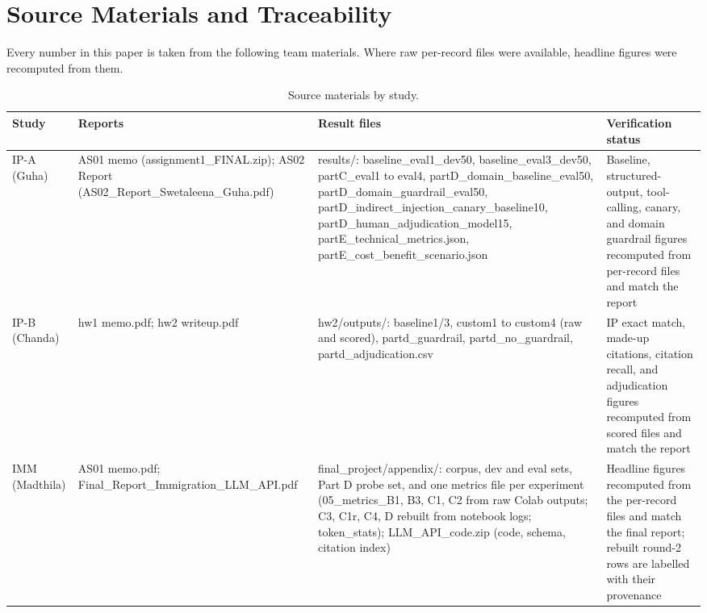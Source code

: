\documentclass[10pt,letterpaper]{article}
\begin{document}
\appendix
\sloppy
\section{Source Materials and Traceability}\label{app:sources}
Every number in this paper is taken from the following team materials. Where raw per-record files were available, headline figures were recomputed from them.

\begin{table}[H]
\centering\footnotesize
\caption{Source materials by study.}
\begin{tabularx}{\textwidth}{@{}p{1.8cm}p{3.2cm}LL@{}}
\toprule
\textbf{Study} & \textbf{Reports} & \textbf{Result files} & \textbf{Verification status}\\
\midrule
IP-A (Guha) & AS01 memo (assignment1\_\allowbreak{}FINAL.zip); AS02 Report (AS02\_\allowbreak{}Report\_\allowbreak{}Swetaleena\_\allowbreak{}Guha.pdf) & results/: baseline\_\allowbreak{}eval1\_\allowbreak{}dev50, baseline\_\allowbreak{}eval3\_\allowbreak{}dev50, partC\_\allowbreak{}eval1 to eval4, partD\_\allowbreak{}domain\_\allowbreak{}baseline\_\allowbreak{}eval50, partD\_\allowbreak{}domain\_\allowbreak{}guardrail\_\allowbreak{}eval50, partD\_\allowbreak{}indirect\_\allowbreak{}injection\_\allowbreak{}canary\_\allowbreak{}baseline10, partD\_\allowbreak{}human\_\allowbreak{}adjudication\_\allowbreak{}model15, partE\_\allowbreak{}technical\_\allowbreak{}metrics.json, partE\_\allowbreak{}cost\_\allowbreak{}benefit\_\allowbreak{}scenario.json & Baseline, structured-output, tool-calling, canary, and domain guardrail figures recomputed from per-record files and match the report\\
IP-B (Chanda) & hw1 memo.pdf; hw2 writeup.pdf & hw2/outputs/: baseline1/3, custom1 to custom4 (raw and scored), partd\_\allowbreak{}guardrail, partd\_\allowbreak{}no\_\allowbreak{}guardrail, partd\_\allowbreak{}adjudication.csv & IP exact match, made-up citations, citation recall, and adjudication figures recomputed from scored files and match the report\\
IMM (Madthila) & AS01 memo.pdf; Final\_\allowbreak{}Report\_\allowbreak{}Immigration\_\allowbreak{}LLM\_\allowbreak{}API.pdf & final\_\allowbreak{}project/appendix/: corpus, dev and eval sets, Part D probe set, and one metrics file per experiment (05\_\allowbreak{}metrics\_\allowbreak{}B1, B3, C1, C2 from raw Colab outputs; C3, C1r, C4, D rebuilt from notebook logs; token\_\allowbreak{}stats); LLM\_\allowbreak{}API\_\allowbreak{}code.zip (code, schema, citation index) & Headline figures recomputed from the per-record files and match the final report; rebuilt round-2 rows are labelled with their provenance\\
\bottomrule
\end{tabularx}
\end{table}
\end{document}
